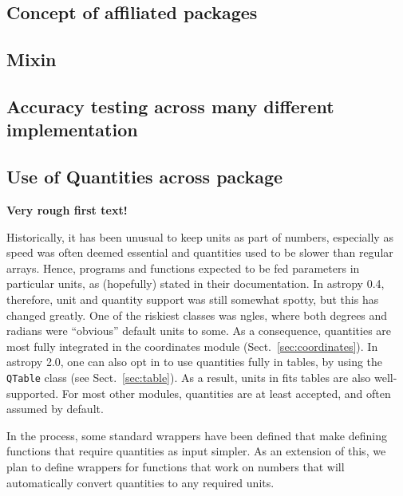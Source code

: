 \documentclass[modern]{aastex61}
\begin{document}
\subsection{Concept of affiliated packages}

\subsection{Mixin}

\subsection{Accuracy testing across many different implementation}

\subsection{Use of Quantities across package}

{\bf Very rough first text!}

Historically, it has been unusual to keep units as part of numbers, especially as speed was often deemed essential and quantities used to be slower than regular arrays. Hence, programs and functions expected to be fed parameters in particular units, as (hopefully) stated in their documentation.  In astropy 0.4, therefore, unit and quantity support was still somewhat spotty, but this has changed greatly.  One of the riskiest classes was ngles, where both degrees and radians were ``obvious'' default units to some. As a consequence, quantities are most fully integrated in the coordinates module (Sect.~\ref{sec:coordinates}). In astropy 2.0, one can also opt in to use quantities fully in tables, by using the {\tt QTable} class (see Sect.~\ref{sec:table}). As a result, units in fits tables are also well-supported. For most other modules, quantities are at least accepted, and often assumed by default.

In the process, some standard wrappers have been defined that make defining functions that require quantities as input simpler. As an extension of this, we plan to define wrappers for functions that work on numbers that will automatically convert quantities to any required units.
\end{document}
